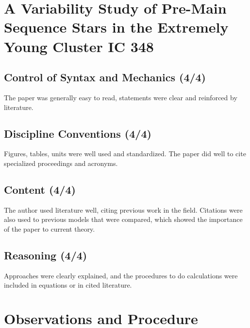 \documentclass[twocolumn]{aastex6}
\begin{document}
\section{A Variability Study of Pre-Main Sequence Stars in the Extremely Young Cluster IC 348}
\subsection{Control of Syntax and Mechanics (4/4)}
The paper was generally easy to read, statements were clear and reinforced by literature.
\subsection{Discipline Conventions (4/4)}
Figures, tables, units were well used and standardized. The paper did well to cite specialized proceedings and acronyms.
\subsection{Content (4/4)}
The author used literature well, citing previous work in the field. Citations were also used to previous models that were compared, which showed the importance of the paper to current theory.
\subsection{Reasoning (4/4)}
Approaches were clearly explained, and the procedures to do calculations were included in equations or in cited literature.


\section{Observations and Procedure} \label{sec:intro}
\end{document}
